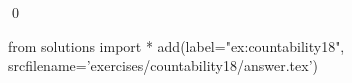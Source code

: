 
\begin{ex} 
  \label{ex:countability18}
  
  \qed
\end{ex} 
\begin{python0}
from solutions import *
add(label="ex:countability18",
    srcfilename='exercises/countability18/answer.tex') 
\end{python0}
